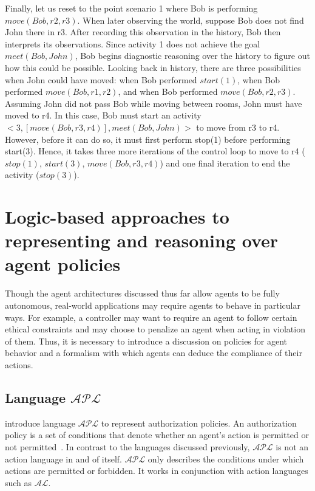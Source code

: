 Finally, let us reset to the point scenario 1 where Bob is performing $move(Bob, r2, r3)$.
When later observing the world, suppose Bob does not find John there in r3.
After recording this observation in the history, Bob then interprets its observations.
Since activity 1 does not achieve the goal $meet(Bob, John)$, Bob begins diagnostic reasoning over the history to figure out how this could be possible.
Looking back in history, there are three possibilities when John could have moved: when Bob performed $start(1)$, when Bob performed $move(Bob, r1, r2)$, and when Bob performed $move(Bob, r2, r3)$.
Assuming John did not pass Bob while moving between rooms, John must have moved to r4.
In this case, Bob must start an activity $<3, [move(Bob, r3, r4)],meet(Bob,John)>$ to move from r3 to r4.
However, before it can do so, it must first perform stop(1) before performing start(3).
Hence, it takes three more iterations of the control loop to move to r4 ($stop(1)$, $start(3)$, $move(Bob, r3,r4)$) and one final iteration to end the activity ($stop(3)$).

\section{Logic-based approaches to representing and reasoning over agent policies}
\label{sec:policies}

Though the agent architectures discussed thus far allow agents to be fully autonomous, real-world applications may require agents to behave in particular ways.
For example, a controller may want to require an agent to follow certain ethical constraints and may choose to penalize an agent when acting in violation of them.
Thus, it is necessary to introduce a discussion on policies for agent behavior and a formalism with which agents can deduce the compliance of their actions.

\subsection{Language $\mathcal{APL}$}

\citet{gelfond_authorization_2008} introduce language $\mathcal{APL}$ to represent authorization policies.
An authorization policy is a set of conditions that denote whether an agent's action is permitted or not permitted~\citep{gelfond_authorization_2008}.
In contrast to the languages discussed previously, $\mathcal{APL}$ is not an action language in and of itself.
$\mathcal{APL}$ only describes the conditions under which actions are permitted or forbidden.
It works in conjunction with action languages such as $\mathcal{AL}$.

